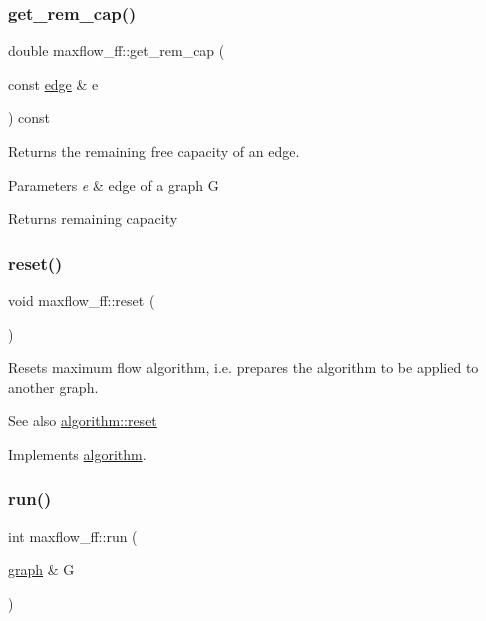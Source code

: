 \subsubsection{\texorpdfstring{get\+\_\+rem\+\_\+cap()}{get\_rem\_cap()}}
{\footnotesize\ttfamily double maxflow\+\_\+ff\+::get\+\_\+rem\+\_\+cap (\begin{DoxyParamCaption}\item[{const \mbox{\hyperlink{classedge}{edge}} \&}]{e }\end{DoxyParamCaption}) const}

Returns the remaining free capacity of an edge.


\begin{DoxyParams}{Parameters}
{\em e} & edge of a graph G \\
\hline
\end{DoxyParams}
\begin{DoxyReturn}{Returns}
remaining capacity 
\end{DoxyReturn}
\mbox{\label{classmaxflow__ff_a893e5136d4f7f1d4b67ef5b67306d17b}} 
\subsubsection{\texorpdfstring{reset()}{reset()}}
{\footnotesize\ttfamily void maxflow\+\_\+ff\+::reset (\begin{DoxyParamCaption}{ }\end{DoxyParamCaption})\hspace{0.3cm}{\ttfamily [virtual]}}

Resets maximum flow algorithm, i.\+e. prepares the algorithm to be applied to another graph.

\begin{DoxySeeAlso}{See also}
\mbox{\hyperlink{classalgorithm_a21aba63d066ae7897de6ca7d8425c408}{algorithm\+::reset}} 
\end{DoxySeeAlso}


Implements \mbox{\hyperlink{classalgorithm_a21aba63d066ae7897de6ca7d8425c408}{algorithm}}.

\mbox{\label{classmaxflow__ff_a0a4391b9093d6966b47c023a555099e2}} 
\subsubsection{\texorpdfstring{run()}{run()}}
{\footnotesize\ttfamily int maxflow\+\_\+ff\+::run (\begin{DoxyParamCaption}\item[{\mbox{\hyperlink{classgraph}{graph}} \&}]{G }\end{DoxyParamCaption})\hspace{0.3cm}{\ttfamily [virtual]}}

